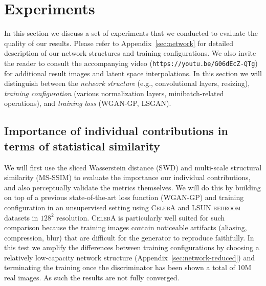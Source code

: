 \documentclass{article}
\newcommand{\videolink}{\texttt{\small{https://youtu.be/G06dEcZ-QTg}}}
\begin{document}
\section{Experiments}
\label{sec:results}

In this section we discuss a set of experiments that we conducted to evaluate the quality of our results.
Please refer to Appendix~\ref{sec:network} for detailed description of our network structures and training configurations.
We also invite the reader to consult the accompanying video (\videolink) for additional result images and latent space interpolations.
In this section we will distinguish between the \emph{network structure} (e.g., convolutional layers, resizing), \emph{training configuration} (various normalization layers, minibatch-related operations), and \emph{training loss} (WGAN-GP, LSGAN).

\subsection{Importance of individual contributions in terms of statistical similarity}
\label{sec:exp-image-quality}

We will first use the sliced Wasserstein distance (SWD) and multi-scale structural similarity (MS-SSIM) \citep{Odena2017} to evaluate the importance our individual contributions, and also perceptually validate the metrics themselves. We will do this by building on top of a previous state-of-the-art loss function (WGAN-GP) and training configuration \citep{Gulrajani2017} in an unsupervised setting using \textsc{CelebA} \citep{CelebA} and \textsc{LSUN bedroom} \citep{LSUN} datasets in $128^2$ resolution. \textsc{CelebA} is particularly well suited for such comparison because the training images contain noticeable artifacts (aliasing, compression, blur) that are difficult for the generator to reproduce faithfully. 
In this test we amplify the differences between training configurations by choosing a relatively low-capacity network structure (Appendix~\ref{sec:network-reduced}) and terminating the training once the discriminator has been shown a total of 10M real images. As such the results are not fully converged. %

\tabvariants
\figvariants
\end{document}
